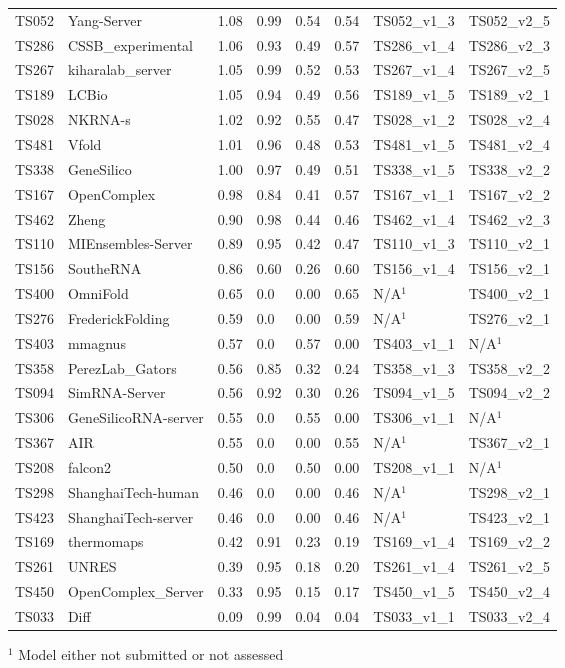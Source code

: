 \begin{table}[ht]
{\begin{tabular}{llllllll}
TS052 & Yang-Server & 1.08 & 0.99 & 0.54 & 0.54 & TS052\_v1\_3 & TS052\_v2\_5 \\ 
TS286 & CSSB\_experimental & 1.06 & 0.93 & 0.49 & 0.57 & TS286\_v1\_4 & TS286\_v2\_3 \\ 
TS267 & kiharalab\_server & 1.05 & 0.99 & 0.52 & 0.53 & TS267\_v1\_4 & TS267\_v2\_5 \\ 
TS189 & LCBio & 1.05 & 0.94 & 0.49 & 0.56 & TS189\_v1\_5 & TS189\_v2\_1 \\ 
TS028 & NKRNA-s & 1.02 & 0.92 & 0.55 & 0.47 & TS028\_v1\_2 & TS028\_v2\_4 \\ 
TS481 & Vfold & 1.01 & 0.96 & 0.48 & 0.53 & TS481\_v1\_5 & TS481\_v2\_4 \\ 
TS338 & GeneSilico & 1.00 & 0.97 & 0.49 & 0.51 & TS338\_v1\_5 & TS338\_v2\_2 \\ 
TS167 & OpenComplex & 0.98 & 0.84 & 0.41 & 0.57 & TS167\_v1\_1 & TS167\_v2\_2 \\ 
TS462 & Zheng & 0.90 & 0.98 & 0.44 & 0.46 & TS462\_v1\_4 & TS462\_v2\_3 \\ 
TS110 & MIEnsembles-Server & 0.89 & 0.95 & 0.42 & 0.47 & TS110\_v1\_3 & TS110\_v2\_1 \\ 
TS156 & SoutheRNA & 0.86 & 0.60 & 0.26 & 0.60 & TS156\_v1\_4 & TS156\_v2\_1 \\ 
TS400 & OmniFold & 0.65 & 0.0 & 0.00 & 0.65 & N/A$^{1}$ & TS400\_v2\_1 \\ 
TS276 & FrederickFolding & 0.59 & 0.0 & 0.00 & 0.59 & N/A$^{1}$ & TS276\_v2\_1 \\ 
TS403 & mmagnus & 0.57 & 0.0 & 0.57 & 0.00 & TS403\_v1\_1 & N/A$^{1}$ \\ 
TS358 & PerezLab\_Gators & 0.56 & 0.85 & 0.32 & 0.24 & TS358\_v1\_3 & TS358\_v2\_2 \\ 
TS094 & SimRNA-Server & 0.56 & 0.92 & 0.30 & 0.26 & TS094\_v1\_5 & TS094\_v2\_2 \\ 
TS306 & GeneSilicoRNA-server & 0.55 & 0.0 & 0.55 & 0.00 & TS306\_v1\_1 & N/A$^{1}$ \\ 
TS367 & AIR & 0.55 & 0.0 & 0.00 & 0.55 & N/A$^{1}$ & TS367\_v2\_1 \\ 
TS208 & falcon2 & 0.50 & 0.0 & 0.50 & 0.00 & TS208\_v1\_1 & N/A$^{1}$ \\ 
TS298 & ShanghaiTech-human & 0.46 & 0.0 & 0.00 & 0.46 & N/A$^{1}$ & TS298\_v2\_1 \\ 
TS423 & ShanghaiTech-server & 0.46 & 0.0 & 0.00 & 0.46 & N/A$^{1}$ & TS423\_v2\_1 \\ 
TS169 & thermomaps & 0.42 & 0.91 & 0.23 & 0.19 & TS169\_v1\_4 & TS169\_v2\_2 \\ 
TS261 & UNRES & 0.39 & 0.95 & 0.18 & 0.20 & TS261\_v1\_4 & TS261\_v2\_5 \\ 
TS450 & OpenComplex\_Server & 0.33 & 0.95 & 0.15 & 0.17 & TS450\_v1\_5 & TS450\_v2\_4 \\ 
TS033 & Diff & 0.09 & 0.99 & 0.04 & 0.04 & TS033\_v1\_1 & TS033\_v2\_4 \\ 
\bottomrule
\end{tabular}%
}
\begin{flushleft}\footnotesize $^{1}$ Model either not submitted or not assessed\end{flushleft}
\end{table}
